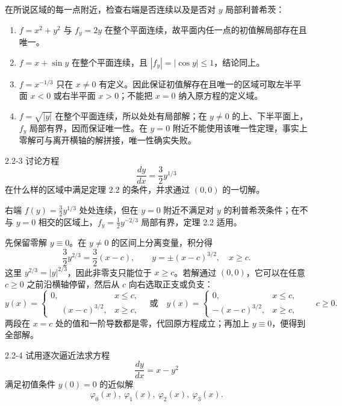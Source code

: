 \documentclass[UTF8,a4paper,11pt]{ctexart}
\begin{document}
\begin{solution}
在所说区域的每一点附近，检查右端是否连续以及是否对 $y$ 局部利普希茨：
\begin{enumerate}[label=(\arabic*)]
\item $f=x^2+y^2$ 与 $f_y=2y$ 在整个平面连续，故平面内任一点的初值解局部存在且唯一。
\item $f=x+\sin y$ 在整个平面连续，且 $|f_y|=|\cos y|\le1$，结论同上。
\item $f=x^{-1/3}$ 只在 $x\ne0$ 有定义。因此保证初值解存在且唯一的区域可取左半平面 $x<0$ 或右半平面 $x>0$；不能把 $x=0$ 纳入原方程的定义域。
\item $f=\sqrt{|y|}$ 在整个平面连续，所以处处有局部解；在 $y\ne0$ 的上、下半平面上，$f_y$ 局部有界，因而保证唯一性。在 $y=0$ 附近不能使用该唯一性定理，事实上零解可与离开横轴的解拼接，唯一性确实失败。
\end{enumerate}
\end{solution}

\begin{problem}{2.2-3}
讨论方程
  \[
    \frac{dy}{dx}=\frac{3}{2}y^{1/3}
  \]
  在什么样的区域中满足定理 2.2 的条件，并求通过 $(0,0)$ 的一切解。
\end{problem}

\begin{solution}
右端 $f(y)=\tfrac32y^{1/3}$ 处处连续，但在 $y=0$ 附近不满足对 $y$ 的利普希茨条件；在不与 $y=0$ 相交的区域上，$f_y=\tfrac12y^{-2/3}$ 局部有界，定理 2.2 适用。

先保留零解 $y\equiv0$。在 $y\ne0$ 的区间上分离变量，积分得
\[
\frac32y^{2/3}=\frac32(x-c),\qquad
y=\pm(x-c)^{3/2},\quad x\ge c.
\]
这里 $y^{2/3}=|y|^{2/3}$，因此非零支只能位于 $x\ge c$。若解通过 $(0,0)$，它可以在任意 $c\ge0$ 之前沿横轴停留，然后从 $c$ 向右选取正支或负支：
\[
\boxed{y(x)=\begin{cases}0,&x\le c,\\
\phantom{-}(x-c)^{3/2},&x\ge c,
\end{cases}\quad\text{或}\quad
y(x)=\begin{cases}0,&x\le c,\\
-(x-c)^{3/2},&x\ge c,
\end{cases}\qquad c\ge0.}
\]
两段在 $x=c$ 处的值和一阶导数都是零，代回原方程成立；再加上 $y\equiv0$，便得到全部解。
\end{solution}

\begin{problem}{2.2-4}
试用逐次逼近法求方程
  \[
    \frac{dy}{dx}=x-y^2
  \]
  满足初值条件 $y(0)=0$ 的近似解
  \[
    \varphi_0(x),\ \varphi_1(x),\ \varphi_2(x),\ \varphi_3(x).
  \]
\end{problem}
\end{document}
